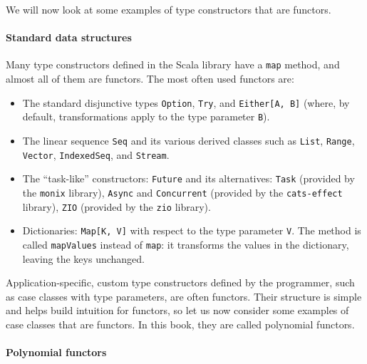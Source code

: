 We will now look at some examples of type constructors that are functors.

\paragraph{Standard data structures}

Many type constructors defined in the Scala library have a \lstinline!map!
method, and almost all of them are functors. The most often used functors
are:
\begin{itemize}
\item The standard disjunctive types \lstinline!Option!, \lstinline!Try!,
and \lstinline!Either[A, B]! (where, by default, transformations
apply to the type parameter \lstinline!B!).
\item The linear sequence \lstinline!Seq! and its various derived classes
such as \lstinline!List!, \lstinline!Range!, \lstinline!Vector!,
\lstinline!IndexedSeq!, and \lstinline!Stream!.
\item The \textsf{``}task-like\textsf{''} constructors: \lstinline!Future! and its alternatives:
\lstinline!Task! (provided by the \texttt{monix} library), \lstinline!Async!
and \lstinline!Concurrent! (provided by the \texttt{cats-effect}
library), \lstinline!ZIO! (provided by the \texttt{zio} library).
\item Dictionaries: \lstinline!Map[K, V]! with respect to the type parameter
\lstinline!V!. The method is called \lstinline!mapValues! instead
of \lstinline!map!: it transforms the values in the dictionary, leaving
the keys unchanged.
\end{itemize}
Application-specific, custom type constructors defined by the programmer,
such as case classes with type parameters, are often functors. Their
structure is simple and helps build intuition for functors, so let
us now consider some examples of case classes that are functors. In
this book, they are called polynomial functors.

\paragraph{Polynomial functors}

